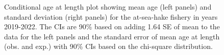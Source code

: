 \documentclass[
]{scrartcl}
\begin{document}
\begin{figure}[H]


\caption{\label{fig-call-plot-ashop2}Conditional age at length plot
showing mean age (left panels) and standard deviation (right panels) for
the at-sea-hake fishery in years 2019-2022. The CIs are 90\% based on
adding 1.64 SE of mean to the data for the left panels and the standard
error of mean age at length (obs. and exp.) with 90\% CIs based on the
chi-square distribution.}

\end{figure}%
\end{document}
